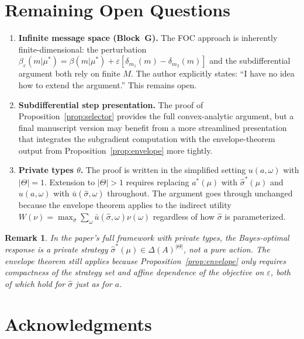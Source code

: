\documentclass[12pt]{article}
\newtheorem{remark}[theorem]{Remark}
\begin{document}
\section{Remaining Open Questions}
\label{sec:open}

\begin{enumerate}
\item \textbf{Infinite message space (Block~G).} The FOC approach is inherently finite-dimensional: the perturbation $\beta_\varepsilon(m|\mu^*) = \beta(m|\mu^*) + \varepsilon[\delta_{m_1}(m) - \delta_{m_2}(m)]$ and the subdifferential argument both rely on finite $M$. The author explicitly states: ``I have no idea how to extend the argument.'' This remains open.

\item \textbf{Subdifferential step presentation.} The proof of Proposition~\ref{prop:selector} provides the full convex-analytic argument, but a final manuscript version may benefit from a more streamlined presentation that integrates the subgradient computation with the envelope-theorem output from Proposition~\ref{prop:envelope} more tightly.

\item \textbf{Private types $\theta$.} The proof is written in the simplified setting $u(a,\omega)$ with $|\Theta|=1$. Extension to $|\Theta| > 1$ requires replacing $a^*(\mu)$ with $\hat\sigma^*(\mu)$ and $u(a,\omega)$ with $\bar{u}(\hat\sigma,\omega)$ throughout. The argument goes through unchanged because the envelope theorem applies to the indirect utility $W(\nu) = \max_{\hat\sigma} \sum_\omega \bar{u}(\hat\sigma,\omega)\nu(\omega)$ regardless of how $\hat\sigma$ is parameterized.
\end{enumerate}

\begin{remark}\label{rem:theta}
In the paper's full framework with private types, the Bayes-optimal response is a private strategy $\hat\sigma^*(\mu) \in \Delta(A)^{|\Theta|}$, not a pure action. The envelope theorem still applies because Proposition~\ref{prop:envelope} only requires compactness of the strategy set and affine dependence of the objective on $\varepsilon$, both of which hold for $\hat\sigma$ just as for $a$.
\end{remark}

\section*{Acknowledgments}
\end{document}
